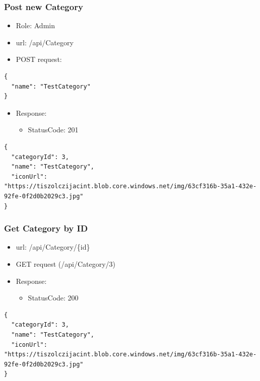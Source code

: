 \documentclass[11pt]{article}
\begin{document}
\subsubsection{Post new Category}
\label{sec:org1ff83f7}
\begin{itemize}
\item Role: Admin
\item url: /api/Category
\item POST request:
\end{itemize}
\begin{verbatim}
{
  "name": "TestCategory"
}
\end{verbatim}
\begin{itemize}
\item Response:
\begin{itemize}
\item StatusCode: 201
\end{itemize}
\end{itemize}
\begin{verbatim}
{
  "categoryId": 3,
  "name": "TestCategory",
  "iconUrl": "https://tiszolczijacint.blob.core.windows.net/img/63cf316b-35a1-432e-92fe-0f2d0b2029c3.jpg"
}
\end{verbatim}
\subsubsection{Get Category by ID}
\label{sec:org5c1e041}
\begin{itemize}
\item url: /api/Category/\{id\}
\item GET request (/api/Category/3)
\item Response:
\begin{itemize}
\item StatusCode: 200
\end{itemize}
\end{itemize}
\begin{verbatim}
{
  "categoryId": 3,
  "name": "TestCategory",
  "iconUrl": "https://tiszolczijacint.blob.core.windows.net/img/63cf316b-35a1-432e-92fe-0f2d0b2029c3.jpg"
}
\end{verbatim}
\end{document}

